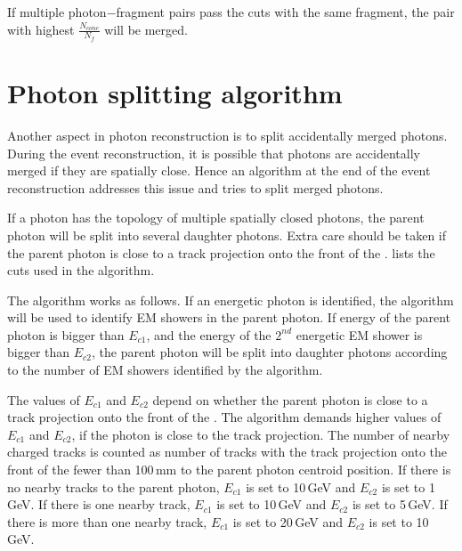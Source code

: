 If multiple photon$-$fragment pairs pass the cuts with the same fragment, the pair with highest $\frac{N_{cone}}{N_f}$ will be merged.



\section{Photon splitting algorithm}
\label{sec:photonSplitting}


Another aspect in photon reconstruction is to split accidentally merged photons. During the event reconstruction, it is possible that photons are accidentally merged if they are spatially close. Hence an algorithm at the end of the event reconstruction addresses this issue and tries to split merged photons.

If a photon has the  topology of multiple spatially closed photons, the parent photon will be split into several daughter photons. Extra care should be taken if the parent photon is close to a track projection onto the front of the \ECAL.  lists the cuts used in the algorithm.

The algorithm works as follows. If an energetic photon is identified, the \peakFinding algorithm will  be used to identify EM showers in the parent photon. If energy of the parent photon is bigger than $E_{c1}$, and the energy of the $2^{nd}$ energetic EM shower is bigger than $E_{c2}$, the parent photon will be split into daughter photons according to the number of EM showers identified by the \peakFinding algorithm.

The values of $E_{c1}$ and $E_{c2}$ depend on whether the parent photon is close to a track projection onto the front of the \ECAL. The algorithm demands  higher values of $E_{c1}$ and   $E_{c2}$, if the photon is close to the track projection. The number of nearby charged tracks is counted as number of tracks with the track projection onto the front of the \ECAL fewer than 100\,mm to the parent photon centroid position. If there is no nearby tracks to the parent photon, $E_{c1}$ is set to 10\,GeV and $E_{c2}$ is set to 1\,GeV. If there is one nearby track, $E_{c1}$ is set to 10\,GeV and $E_{c2}$ is set to 5\,GeV. If there is more than one nearby track, $E_{c1}$ is set to 20\,GeV and $E_{c2}$ is set to 10\,GeV.


